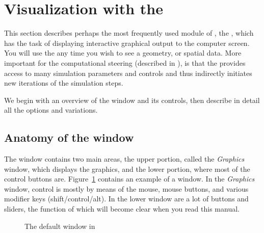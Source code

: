   \newcommand{\ringwidget}%
  {\centerline{\epsfig{file=figures/widget-ring.eps.gz,height=2in,
  bbllx=0, bblly=0, bburx=507, bbury=467}}}
\begin{htmlonly}
  \newcommand{\ringwidget}{%
  \htmladdimg[align=top,width=508,alt="ringwidget"]
  {../figures/widget-ring.gif}}
\end{htmlonly}

\newcommand{\graphics}{\emph{Graphics}}

\section{Visualization with the \viewer{}}
\label{sec:viewer}
\index{\viewer{}}

This section describes perhaps the most frequently used module of \SR{},
the \viewer{}, which has the task of displaying interactive graphical
output to the computer screen.  You will use the \viewer{} any time you
wish to see a geometry, or spatial data.  More important for the
computational steering (described in ), is that the \viewer{} provides access to
many simulation parameters and controls and thus indirectly initiates new
iterations of the simulation steps.

We begin with an overview of the \viewer{} window and its controls, then
describe in detail all the options and variations.

\subsection{Anatomy of the \viewer{} window}
\label{sec:viewer-anatomy} 

The \viewer{} window contains two main areas, the upper portion, called the
\graphics{} window, which displays the graphics, and the lower portion,
where most of the control buttons are.  Figure~\ref{fig:viewwindow}
contains an example of a \viewer{} window. In the \graphics{}
window, control is mostly by means of the mouse, mouse buttons, and various
modifier keys (shift/control/alt).  In the lower window are a lot of
buttons and sliders, the function of which will become clear when you read
this manual.

\begin{figure}[htb]
  \begin{makeimage}
  \end{makeimage}
  \viewerwindow
  \caption{\label{fig:viewwindow} The default \viewer{} window in \SR{}}
\end{figure}


